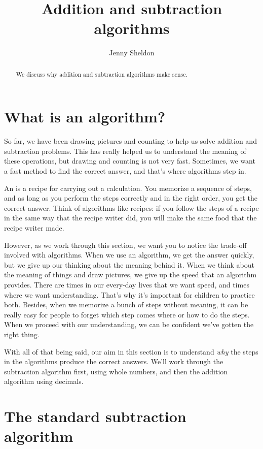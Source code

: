 \documentclass{ximera}
\title{Addition and subtraction algorithms}
\author{Jenny Sheldon}
\begin{document}
\begin{abstract}
We discuss why addition and subtraction algorithms make sense.
\end{abstract}
\maketitle



\section{What is an algorithm?}

So far, we have been drawing pictures and counting to help us solve addition and subtraction problems. This has really helped us to understand the meaning of these operations, but drawing and counting is not very fast. Sometimes, we want a fast method to find the correct answer, and that's where algorithms step in.

An  is a recipe for carrying out a calculation. You memorize a sequence of steps, and as long as you perform the steps correctly and in the right order, you get the correct answer. Think of algorithms like recipes: if you follow the steps of a recipe in the same way that the recipe writer did, you will make the same food that the recipe writer made.

However, as we work through this section, we want you to notice the trade-off involved with algorithms. When we use an algorithm, we get the answer quickly, but we give up our thinking about the meaning behind it. When we think about the meaning of things and draw pictures, we give up the speed that an algorithm provides. There are times in our every-day lives that we want speed, and times where we want understanding. That's why it's important for children to practice both. Besides, when we memorize a bunch of steps without meaning, it can be really easy for people to forget which step comes where or how to do the steps. When we proceed with our understanding, we can be confident we've gotten the right thing.

With all of that being said, our aim in this section is to understand \emph{why} the steps in the algorithms produce the correct answers. We'll work through the subtraction algorithm first, using whole numbers, and then the addition algorithm using decimals.

\section{The standard subtraction algorithm}
\end{document}
